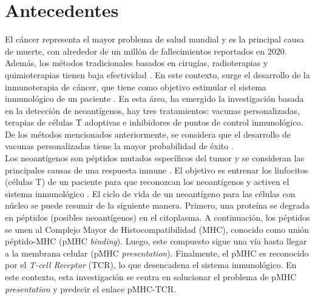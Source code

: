 \documentclass[a4paper]{article}
\begin{document}
	
	
	
	
	
	
	
	
	
	\maketitle
	
	\section{Antecedentes}
	
	El cáncer representa el mayor problema de salud mundial y es la principal causa de muerte, con alrededor de un millón de fallecimientos reportados en 2020. Además, los métodos tradicionales basados en cirugías, radioterapias y quimioterapias tienen baja efectividad \citep{peng2019neoantigen}. En este contexto, surge el desarrollo de la inmunoterapia de cáncer, que tiene como objetivo estimular el sistema inmunológico de un paciente \citep{borden2022cancer}. En esta área, ha emergido la investigación basada en la detección de neoantígenos, hay tres tratamientos: vacunas personalizadas, terapias de células T adoptivas e inhibidores de puntos de control inmunológico. De los métodos mencionados anteriormente, se considera que el desarrollo de vacunas personalizadas  tiene la mayor probabilidad de éxito \citep{borden2022cancer}.\\

Los neoantígenos son péptidos mutados específicos del tumor y se consideran las principales causas de una respuesta inmune \citep{borden2022cancer,chen2021challenges,gopanenko2020main}. El objetivo es entrenar los linfocitos (células T) de un paciente para que reconozcan los neoantígenos y activen el sistema inmunológico \citep{de2020neoantigen,peng2019neoantigen}. El ciclo de vida de un neoantígeno para las células con núcleo se puede resumir de la siguiente manera. Primero, una proteína se degrada en péptidos (posibles neoantígenos) en el citoplasma. A continuación, los péptidos se unen al Complejo Mayor de Histocompatibilidad (MHC), conocido como unión péptido-MHC (pMHC \textit{binding}). Luego, este compuesto sigue una vía hasta llegar a la membrana celular (pMHC \textit{presentation}). Finalmente, el pMHC es reconocido por el \textit{T-cell Receptor} (TCR), lo que desencadena el sistema inmunológico. En este contexto, esta investigación se centra en solucionar el problema de pMHC \textit{presentation} y predecir el enlace pMHC-TCR.\\
\end{document}
